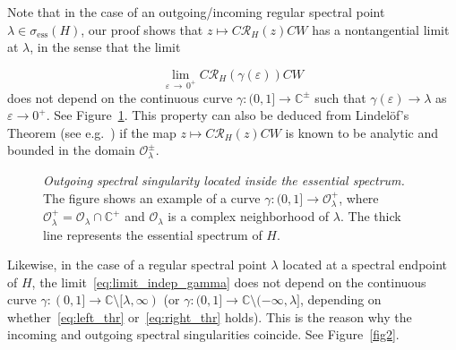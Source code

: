\documentclass[10pt]{amsart}
\theoremstyle{definition}\newtheorem{defi}[theo]{Definition}\newtheorem{rema}[theo]{Remark}\newtheorem{exam}[theo]{Example}\newtheorem{exem}[theo]{Example}\newtheorem{nota}[theo]{Notation}
\newcommand{\bbC}{\mathbb{C}}
\newcommand{\ess}{\mathrm{ess}}
\newcommand{\Res}{\mathcal{R}}
\begin{document}
Note that in the case of an outgoing/incoming regular spectral point $\lambda\in\sigma_{\ess}(H)$, our proof shows that $z\mapsto C\Res_H(z)CW$ has a nontangential limit at $\lambda$, in the sense that the limit

\begin{equation}\label{eq:limit_indep_gamma}
\lim_{\varepsilon\,\to\,0^+}C\Res_H(\gamma(\varepsilon))CW
\end{equation}
does not depend on the continuous curve $\gamma:(0,1]\to\bbC^\pm$ such that $\gamma(\varepsilon)\to\lambda$ as $\varepsilon\to0^+$. See Figure~\ref{fig4}. This property can also be deduced from Lindel\"of's Theorem (see e.g.~\cite{Rud1980}) if the map $z\mapsto C\Res_H(z)CW$ is known to be analytic and bounded in the domain $\mathcal{O}_\lambda^\pm$.

\begin{figure}[H]
\begin{center}
\end{center}
\caption{\emph{Outgoing spectral singularity located inside the essential spectrum.} The figure shows an example of a curve $\gamma:(0,1]\to\mathcal{O}^+_\lambda$, where $\mathcal{O}^+_\lambda=\mathcal{O}_\lambda\cap \bbC^+$ and $\mathcal{O}_\lambda$ is a complex neighborhood of $\lambda$. The thick line represents the essential spectrum of $H$.}\label{fig4}
\end{figure}



Likewise, in the case of a regular spectral point $\lambda$ located at a spectral endpoint of $H$, the limit~\eqref{eq:limit_indep_gamma} does not depend on the continuous curve $\gamma:(0,1]\to\bbC\setminus [\lambda,\infty)$ (or $\gamma:(0,1]\to\bbC\setminus (-\infty,\lambda]$, depending on whether~\eqref{eq:left_thr} or~\eqref{eq:right_thr} holds). This is the reason why the incoming and outgoing spectral singularities coincide. See Figure~\ref{fig2}.
\end{document}
